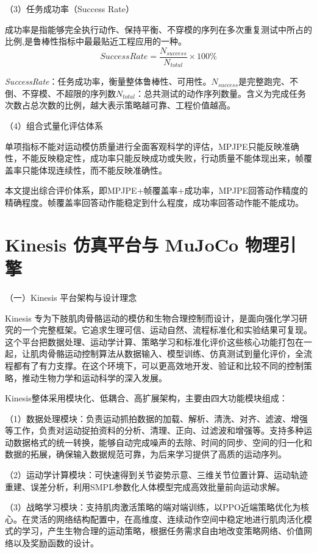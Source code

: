 （3）任务成功率（Success Rate）

成功率是指能够完全执行动作、保持平衡、不穿模的序列在多次重复测试中所占的比例,是鲁棒性指标中最最贴近工程应用的一种。
\begin{equation}
SuccessRate = \frac{N_{success}}{N_{total}} \times 100\%
\tag{2-3}
\end{equation}

\emph{SuccessRate}：任务成功率，衡量整体鲁棒性、可用性。\(N_{success}\)是完整跑完、不倒、不穿模、不超限的序列数\(N_{total}\)：总共测试的动作序列数量。含义为完成任务次数占总次数的比例，越大表示策略越可靠、工程价值越高。

（4）组合式量化评估体系

单项指标不能对运动模仿质量进行全面客观科学的评估，MPJPE只能反映准确性，不能反映稳定性，成功率只能反映成功或失败，行动质量不能体现出来，帧覆盖率只能体现连续性，而不能反映准确性。

本文提出综合评价体系，即MPJPE+帧覆盖率+成功率，MPJPE回答动作精度的精确程度。帧覆盖率回答动作能稳定到什么程度，成功率回答动作能不能成功。

\section{Kinesis 仿真平台与 MuJoCo 物理引擎}\label{kinesis-ux4effux771fux5e73ux53f0ux4e0e-mujoco-ux7269ux7406ux5f15ux64ce}

（一）Kinesis 平台架构与设计理念

Kinesis
专为下肢肌肉骨骼运动的模仿和生物合理控制而设计，是面向强化学习研究的一个完整框架。它追求生理可信、运动自然、流程标准化和实验结果可复现。这个平台把数据处理、运动学计算、策略学习和标准化评价这些核心功能打包在一起，让肌肉骨骼运动控制算法从数据输入、模型训练、仿真测试到量化评价，全流程都有了有力支撑。在这个环境下，可以更高效地开发、验证和比较不同的控制策略，推动生物力学和运动科学的深入发展。

Kinesis整体采用模块化、低耦合、高扩展架构，主要由四大功能模块组成：

（1）数据处理模块：负责运动抓拍数据的加载、解析、清洗、对齐、滤波、增强等工作，负责对运动捉拍资料的分析、清理、正向、过滤波和增强等。支持多种运动数据格式的统一转换，能够自动完成噪声的去除、时间的同步、空间的归一化和数据的拓展，确保输入数据规范可靠，为后来学习提供了高质的运动序列。

（2）运动学计算模块：可快速得到关节姿势示意、三维关节位置计算、运动轨迹重建、误差分析，利用SMPL参数化人体模型完成高效批量前向运动求解。

（3）战略学习模块：支持肌肉激活策略的端对端训练，以PPO近端策略优化为核心。在灵活的网络结构配置中，在高维度、连续动作空间中稳定地进行肌肉活化模式的学习，产生生物合理的运动策略，根据任务需求自由地改变策略网络、价值网络以及奖励函数的设计。

